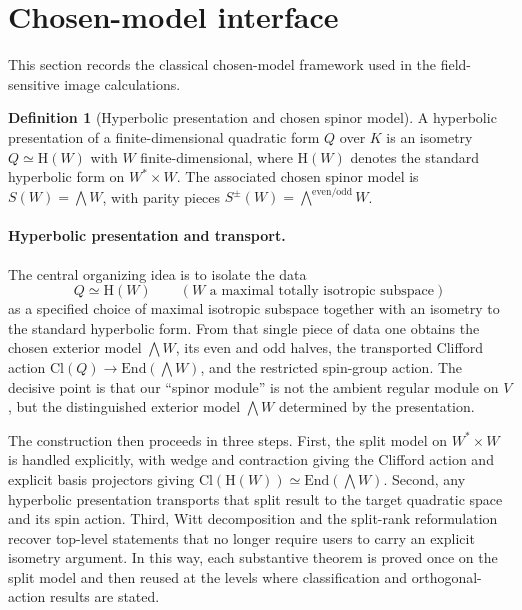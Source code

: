 \documentclass{birkjour}
\theoremstyle{plain}
\theoremstyle{definition}
\newtheorem{definition}[theorem]{Definition}
\theoremstyle{remark}
\numberwithin{equation}{section}
\newcommand{\Cl}{\mathrm{Cl}}
\newcommand{\End}{\mathrm{End}}
\newcommand{\Hyp}{\mathrm{H}}
\begin{document}
\section{Chosen-model interface}
\label{sec:arch}

This section records the classical chosen-model framework used in the
field-sensitive image calculations.

\begin{definition}[Hyperbolic presentation and chosen spinor model]
A hyperbolic presentation of a finite-dimensional quadratic form $Q$ over $K$
is an isometry $Q \simeq \Hyp(W)$ with $W$ finite-dimensional, where
$\Hyp(W)$ denotes the standard hyperbolic form on $W^* \times W$. The
associated chosen spinor model is $S(W)=\bigwedge W$, with parity pieces
$S^\pm(W)=\bigwedge^{\mathrm{even}/\mathrm{odd}} W$.
\end{definition}

\paragraph{Hyperbolic presentation and transport.} The central organizing idea is
to isolate the data
\[
  Q \simeq \Hyp(W)
  \qquad (W \text{ a maximal totally isotropic subspace})
\]
as a specified choice of maximal isotropic subspace together with an isometry to
the standard hyperbolic form. From that single piece of data one obtains the
chosen exterior model $\bigwedge W$, its even and odd halves, the transported
Clifford action $\Cl(Q)\to\End(\bigwedge W)$, and the restricted spin-group
action. The decisive point is that our ``spinor module'' is not the
ambient regular module on $V$, but the distinguished exterior model $\bigwedge W$
determined by the presentation.

The construction then proceeds in three steps. First, the split model on
$W^* \times W$ is handled explicitly, with wedge and contraction giving the
Clifford action and explicit basis projectors giving
$\Cl(\Hyp(W))\simeq\End(\bigwedge W)$. Second, any hyperbolic
presentation transports that split result to the target quadratic space and
its spin action. Third, Witt decomposition and the split-rank reformulation recover
top-level statements that no longer require users to carry an explicit isometry
argument. In this way, each substantive theorem is proved once on the split
model and then reused at the levels where classification and orthogonal-action
results are stated.
\end{document}

